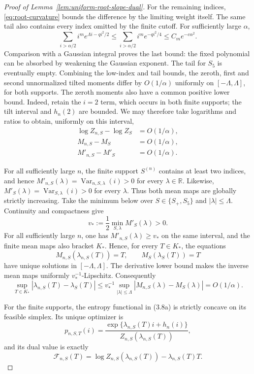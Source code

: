 \documentclass[a4paper,10pt,reqno]{amsart}
\numberwithin{equation}{section}
\theoremstyle{plain}
\theoremstyle{remark}
\begin{document}
\begin{proof}[Proof of Lemma~\ref{lem:uniform-root-slope-dual}]
For the remaining indices, \eqref{eq:root-curvature} bounds the difference by the
limiting weight itself. The same tail also contains every index omitted by
the finite cutoff. For sufficiently large $\alpha$,
\[
  \sum_{i>\alpha/2}i^m e^{\Lambda i-qi^2/2}
  \le\sum_{i>\alpha/2}i^m e^{-qi^2/4}
  \le C_m e^{-c\alpha^2}.
\]
Comparison with a Gaussian integral proves the last bound: the fixed
polynomial can be absorbed by weakening the Gaussian exponent. The tail for
$S_5$ is eventually empty. Combining the low-index and tail bounds, the
zeroth, first and second unnormalized tilted moments differ by
$O(1/\alpha)$ uniformly on $[-\Lambda,\Lambda]$, for both supports. The
zeroth moments also have a common positive lower bound. Indeed, retain the
$i=2$ term, which occurs in both finite supports; the tilt interval and
$h_n(2)$ are bounded. We may therefore take logarithms and ratios to obtain,
uniformly on this interval,
\[
\begin{split}
  \log Z_{n,S}-\log Z_S&=O(1/\alpha),\\
  M_{n,S}-M_S&=O(1/\alpha),\\
  M'_{n,S}-M'_S&=O(1/\alpha).
\end{split}
\]


For all sufficiently large $n$, the finite support $S^{(n)}$ contains at
least two indices, and hence
$M'_{n,S}(\lambda)=\operatorname{Var}_{n,S,\lambda}(i)>0$ for every
$\lambda\in\mathbb R$. Likewise,
$M'_S(\lambda)=\operatorname{Var}_{S,\lambda}(i)>0$ for every $\lambda$.
Thus both mean maps are globally strictly increasing. Take the minimum
below over $S\in\{S_+,S_5\}$ and $|\lambda|\le\Lambda$. Continuity and
compactness give
\[
  v_*:=\frac12
  \min_{S,\lambda}
  M'_S(\lambda)>0.
\]
For all sufficiently large $n$, one has
$M'_{n,S}(\lambda)\ge v_*$ on the same interval, and the finite mean maps
also bracket $K_*$. Hence, for every $T\in K_*$, the equations
\[
  M_{n,S}(\lambda_{n,S}(T))=T,
  \qquad
  M_S(\lambda_S(T))=T
\]
have unique solutions in $[-\Lambda,\Lambda]$. The derivative lower bound
makes the inverse mean maps uniformly $v_*^{-1}$-Lipschitz. Consequently
\[
  \sup_{T\in K_*}
  |\lambda_{n,S}(T)-\lambda_S(T)|
  \le
  v_*^{-1}\sup_{|\lambda|\le\Lambda}
  |M_{n,S}(\lambda)-M_S(\lambda)|
  =O(1/\alpha).
\]

For the finite supports, the entropy functional in (3.8a) is strictly
concave on its feasible simplex. Its unique optimizer is
\[
  p_{n,S,T}(i)
  =\frac{
    \exp\{\lambda_{n,S}(T)i+h_n(i)\}
  }{Z_{n,S}(\lambda_{n,S}(T))},
\]
and its dual value is exactly
\[
  \mathcal F_{n,S}(T)
  =\log Z_{n,S}(\lambda_{n,S}(T))
   -\lambda_{n,S}(T)T.
\]


\end{proof}
\end{document}
